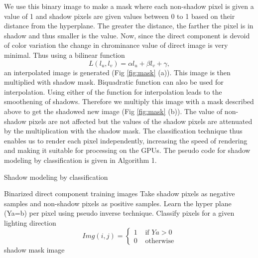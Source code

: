 We use this binary image to make  a mask where each non-shadow pixel is given a
value of 1 and shadow pixels are given values between 0 to 1 based on their
distance from the hyperplane. The greater the distance, the farther the pixel is
in shadow and thus smaller is the value. Now, since the direct component is
devoid of color variation the change in chrominance value of direct image is
very minimal. Thus using a bilinear function
\begin{equation}
L(l_u,l_v) = \alpha l_u + \beta l_v +\gamma,
\end{equation}
an interpolated image is generated (Fig \ref{fig:mask} (a)). This image is then multiplied
with shadow mask. Biquadratic function can also be used for
interpolation. Using either of the function for interpolation leads to the
smoothening of shadows. Therefore we multiply this image with a mask described
above to get the shadowed new image (Fig \ref{fig:mask} (b)). The value of non-shadow pixels
are not affected but the values of the shadow pixels are attenuated by the
multiplication with the shadow mask. The classification technique thus enables
us to render each pixel independently, increasing the speed of rendering and
making it suitable for processing on the GPUs. The pseudo code for shadow modeling by
classification is given in Algorithm 1.
\begin{algorithm}
\caption{Shadow modeling by classification}
\begin{algorithmic}[1] 
\REQUIRE Binarized direct component training images
\STATE Take shadow pixels as negative samples and non-shadow pixels as positive samples.
\STATE Learn the hyper plane (Ya=b) per pixel using pseudo inverse technique.
\STATE Classify pixels for a given lighting direction
$$
Img(i,j) = \left\{ \begin{array}{rl}
  1 &\mbox{ if $Ya>0$} \\
  0 &\mbox{ otherwise}
       \end{array} \right.
$$
\ENSURE shadow mask image 
\end{algorithmic}
\end{algorithm}


